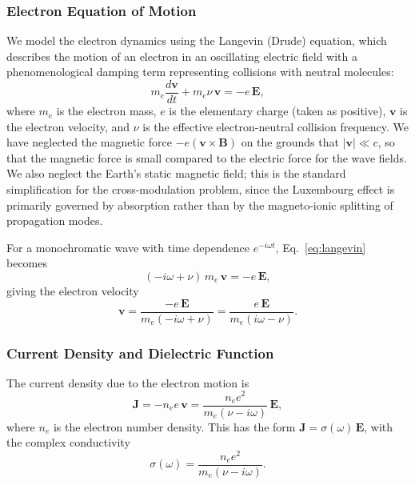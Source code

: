 \documentclass[12pt]{article}
\begin{document}
\subsubsection{Electron Equation of Motion}

We model the electron dynamics using the Langevin (Drude) equation, which describes the
motion of an electron in an oscillating electric field with a phenomenological damping term
representing collisions with neutral molecules:
\begin{equation}
  m_e \frac{d\mathbf{v}}{dt} + m_e \nu \,\mathbf{v} = -e\,\mathbf{E},
  \label{eq:langevin}
\end{equation}
where $m_e$ is the electron mass, $e$ is the elementary charge (taken as positive),
$\mathbf{v}$ is the electron velocity, and $\nu$ is the effective electron-neutral
collision frequency.  We have neglected the magnetic force $-e(\mathbf{v}\times\mathbf{B})$
on the grounds that $|\mathbf{v}| \ll c$, so that the magnetic force is small compared to
the electric force for the wave fields.  We also neglect the Earth's static magnetic field;
this is the standard simplification for the cross-modulation problem, since the
Luxembourg effect is primarily governed by absorption rather than by the
magneto-ionic splitting of propagation modes.

For a monochromatic wave with time dependence $e^{-i\omega t}$, Eq.~\eqref{eq:langevin}
becomes
\begin{equation}
  (-i\omega + \nu)\,m_e\,\mathbf{v} = -e\,\mathbf{E},
\end{equation}
giving the electron velocity
\begin{equation}
  \mathbf{v} = \frac{-e\,\mathbf{E}}{m_e(-i\omega + \nu)}
             = \frac{e\,\mathbf{E}}{m_e(i\omega - \nu)}.
  \label{eq:v_solution}
\end{equation}

\subsubsection{Current Density and Dielectric Function}

The current density due to the electron motion is
\begin{equation}
  \mathbf{J} = -n_e e\,\mathbf{v}
             = \frac{n_e e^2}{m_e(\nu - i\omega)}\,\mathbf{E},
  \label{eq:current}
\end{equation}
where $n_e$ is the electron number density.  This has the form $\mathbf{J} =
\sigma(\omega)\,\mathbf{E}$, with the complex conductivity
\begin{equation}
  \sigma(\omega) = \frac{n_e e^2}{m_e(\nu - i\omega)}.
  \label{eq:conductivity}
\end{equation}
\end{document}
